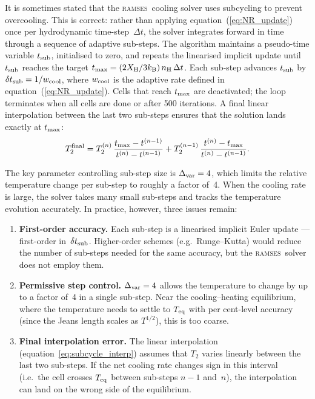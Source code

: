 \documentclass[fleqn,usenatbib]{mnras}
\newcommand{\ramses}{\textsc{ramses}}
\begin{document}
It is sometimes stated that the \ramses\ cooling solver uses subcycling
to prevent overcooling.  This is correct: rather than applying
equation~(\ref{eq:NR_update}) once per hydrodynamic time-step~$\Delta t$,
the solver integrates forward in time through a sequence of adaptive
sub-steps.  The algorithm maintains a pseudo-time variable
$t_{\rm sub}$, initialised to zero, and repeats the linearised implicit
update until $t_{\rm sub}$ reaches the target
$t_{\rm max} = (2X_{\rm H}/3k_{\rm B})\,n_{\rm H}\,\Delta t$.
Each sub-step advances $t_{\rm sub}$ by
$\delta t_{\rm sub} = 1/w_{\rm cool}$, where $w_{\rm cool}$ is the
adaptive rate defined in equation~(\ref{eq:NR_update}).  Cells that
reach $t_{\rm max}$ are deactivated; the loop terminates when all cells
are done or after 500 iterations.  A final linear interpolation between
the last two sub-steps ensures that the solution lands exactly at
$t_{\rm max}$:
\begin{equation}
  T_2^{\rm final} = T_2^{(n)}\,
  \frac{t_{\rm max} - t^{(n-1)}}{t^{(n)} - t^{(n-1)}}
  + T_2^{(n-1)}\,
  \frac{t^{(n)} - t_{\rm max}}{t^{(n)} - t^{(n-1)}}.
  \label{eq:subcycle_interp}
\end{equation}

The key parameter controlling sub-step size is
$\Delta_{\rm var} = 4$, which limits the relative temperature change per
sub-step to roughly a factor of~4.  When the cooling rate is large, the
solver takes many small sub-steps and tracks the temperature evolution
accurately.  In practice, however, three issues remain:

\begin{enumerate}
  \item \textbf{First-order accuracy.}  Each sub-step is a linearised
    implicit Euler update --- first-order in~$\delta t_{\rm sub}$.
    Higher-order schemes (e.g.\ Runge--Kutta) would reduce the number of
    sub-steps needed for the same accuracy, but the \ramses\ solver does
    not employ them.
  \item \textbf{Permissive step control.}  $\Delta_{\rm var} = 4$ allows
    the temperature to change by up to a factor of~4 in a single
    sub-step.  Near the cooling--heating equilibrium, where the
    temperature needs to settle to $T_{\rm eq}$ with per cent-level
    accuracy (since the Jeans length scales as $T^{1/2}$), this is too
    coarse.
  \item \textbf{Final interpolation error.}  The linear interpolation
    (equation~\ref{eq:subcycle_interp}) assumes that $T_2$ varies
    linearly between the last two sub-steps.  If the net cooling rate
    changes sign in this interval (i.e.\ the cell crosses $T_{\rm eq}$
    between sub-steps $n{-}1$ and~$n$), the interpolation can land on
    the wrong side of the equilibrium.
\end{enumerate}
\end{document}
